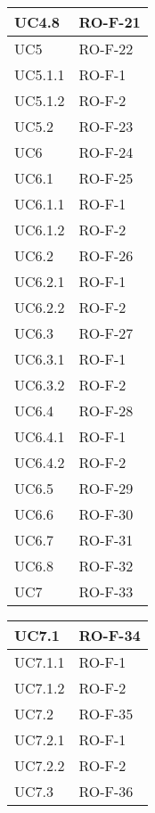 \begin{center}
\begin{tabular}{ |m{8em}|m{13em}| }
    \hline
    UC4.8       &   RO-F-21 \\
    \hline
    UC5         &   RO-F-22 \\
    \hline
    UC5.1.1     &   RO-F-1 \\
    \hline
    UC5.1.2     &   RO-F-2 \\
    \hline
    UC5.2       &   RO-F-23 \\
    \hline
    UC6         &   RO-F-24 \\
    \hline
    UC6.1       &   RO-F-25 \\
    \hline
    UC6.1.1     &   RO-F-1 \\
    \hline
    UC6.1.2     &   RO-F-2 \\
    \hline
    UC6.2       &   RO-F-26 \\
    \hline
    UC6.2.1     &   RO-F-1 \\
    \hline
    UC6.2.2     &   RO-F-2 \\
    \hline
    UC6.3       &   RO-F-27 \\
    \hline
    UC6.3.1     &   RO-F-1 \\
    \hline
    UC6.3.2     &   RO-F-2 \\
    \hline
    UC6.4       &   RO-F-28 \\
    \hline
    UC6.4.1     &   RO-F-1 \\
    \hline
    UC6.4.2     &   RO-F-2 \\
    \hline
    UC6.5       &   RO-F-29 \\
    \hline
    UC6.6       &   RO-F-30 \\
    \hline
    UC6.7       &   RO-F-31 \\
    \hline
    UC6.8       &   RO-F-32 \\
    \hline
    UC7         &   RO-F-33 \\
    \hline
    \end{tabular}
    \newpage
    \begin{tabular}{ |m{8em}|m{13em}| }
    \hline
    UC7.1       &   RO-F-34 \\
    \hline
    UC7.1.1     &   RO-F-1 \\
    \hline
    UC7.1.2     &   RO-F-2 \\
    \hline
    UC7.2       &   RO-F-35 \\
    \hline
    UC7.2.1     &   RO-F-1 \\
    \hline
    UC7.2.2     &   RO-F-2 \\
    \hline
    UC7.3       &   RO-F-36 \\

\end{tabular}
\end{center}
